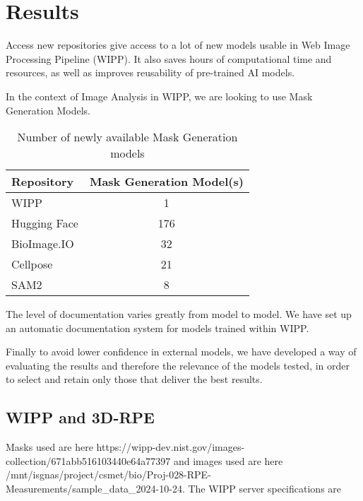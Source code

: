 \section{Results}
\label{sec:results}

Access new repositories give access to a lot of new models usable in Web Image
Processing Pipeline (WIPP). It also saves hours of computational time and
resources, as well as improves reusability of pre-trained AI models.

In the context of Image Analysis in WIPP, we are looking to use Mask
Generation Models.

\begin{table}[H]
\centering
\caption{\label{tab:number_of_newly_available_models}%
  Number of newly available Mask Generation models
}
\begin{tabular}{lc}
  \toprule
  Repository & Mask Generation Model(s) \\
  \midrule
  WIPP & 1 \\
  Hugging Face & 176 \\
  BioImage.IO & 32 \\
  Cellpose & 21 \\
  SAM2 & 8 \\
  \bottomrule
\end{tabular}
\end{table}

The level of documentation varies greatly from model to model. We have set up an
automatic documentation system for models trained within WIPP.

Finally to avoid lower confidence in external models, we have developed a way of
evaluating the results and therefore the relevance of the models tested, in
order to select and retain only those that deliver the best results.

\subsection{WIPP and 3D-RPE}

Masks used are here
https://wipp-dev.nist.gov/images-collection/671abb516103440e64a77397 and images
used are here
/mnt/isgnas/project/csmet/bio/Proj-028-RPE-Measurements/sample\_data\_2024-10-24.
The WIPP server specifications are \TODO\


